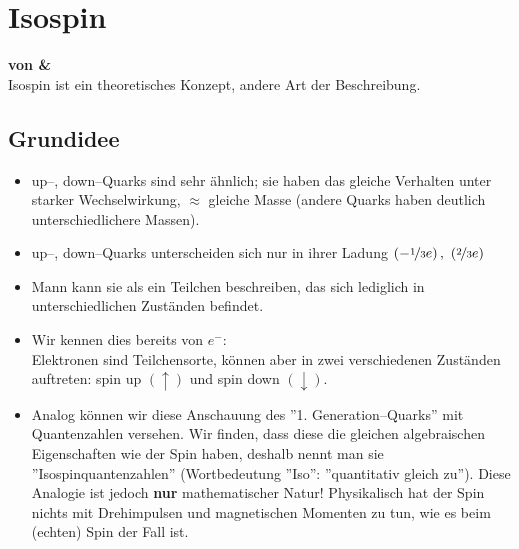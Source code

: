\documentclass[Ex4_Zusammenfassung.tex]{subfiles}
\begin{document}
\section{Isospin}
\textbf{von \michi \& \paul}\\

Isospin ist ein theoretisches Konzept, andere Art der Beschreibung.
\subsection{Grundidee}
\begin{itemize}
	\item up--, down--Quarks sind sehr ähnlich; sie haben das gleiche Verhalten unter starker Wechselwirkung, $\approx$ gleiche Masse (andere Quarks haben deutlich unterschiedlichere Massen).
	\item up--, down--Quarks unterscheiden sich nur in ihrer Ladung $\left( - \nicefrac{1}{3}e\right),\ \left( \nicefrac{2}{3}e \right) $
	\item Mann kann sie als ein Teilchen beschreiben, das sich lediglich in unterschiedlichen Zuständen befindet.
	\item Wir kennen dies bereits von $e^-$: \\
	Elektronen sind Teilchensorte, können aber in zwei verschiedenen Zuständen auftreten: spin up $(\uparrow)$ und spin down $(\downarrow)$.
	\item Analog können wir diese Anschauung des ''1. Generation--Quarks'' mit Quantenzahlen versehen. Wir finden, dass diese die gleichen algebraischen Eigenschaften wie der Spin haben, deshalb nennt man sie ''Isospinquantenzahlen'' (Wortbedeutung ''Iso'': ''quantitativ gleich zu''). Diese Analogie ist jedoch \textbf{nur} mathematischer Natur! Physikalisch hat der Spin nichts mit Drehimpulsen und magnetischen Momenten zu tun, wie es beim (echten) Spin der Fall ist. 
\end{itemize}
\end{document}
